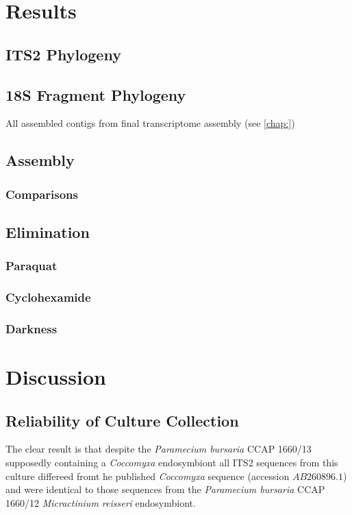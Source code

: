 \section{Results}

\subsection{ITS2 Phylogeny}



\subsection{18S Fragment Phylogeny}

All assembled contigs from final transcriptome assembly (see \ref{chap:})


\subsection{Assembly}
\subsubsection{Comparisons}
\subsection{Elimination}
\subsubsection{Paraquat}
\subsubsection{Cyclohexamide}
\subsubsection{Darkness}



\section{Discussion}

\subsection{Reliability of Culture Collection}

The clear result is that despite the \textit{Paramecium bursaria} CCAP 1660/13
supposedly containing a \textit{Coccomyxa} endosymbiont 
all ITS2 sequences from this culture differeed fromt he published
\textit{Coccomyxa} sequence (accession \(AB260896.1\)) and were identical
to those sequences from the \textit{Paramecium bursaria} CCAP 1660/12 \textit{Micractinium
reisseri} endosymbiont.



